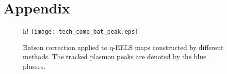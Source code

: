 \section*{Appendix}

\begin{figure}{h!}
    \centering
    \texttt{[image: tech\_comp\_bat\_peak.eps]}\caption{Batson correction applied to q-EELS maps constructed by different methods. The tracked plasmon peaks are denoted by the blue plusses.}
    \label{fig:bat-cor-comp}
\end{figure}
